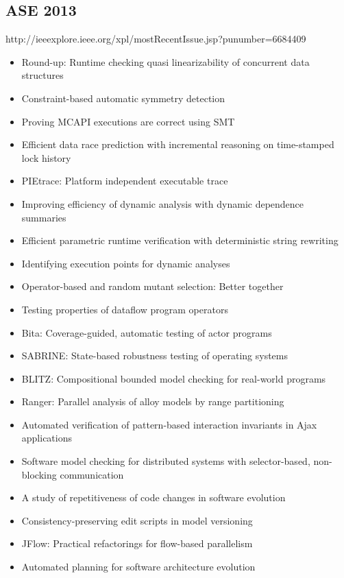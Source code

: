 \subsection{ASE 2013}

http://ieeexplore.ieee.org/xpl/mostRecentIssue.jsp?punumber=6684409

{\small
\begin{itemize}[itemsep=-1ex]
  \item Round-up: Runtime checking quasi linearizability of concurrent data structures
  \item Constraint-based automatic symmetry detection
  \item Proving MCAPI executions are correct using SMT
  \item Efficient data race prediction with incremental reasoning on time-stamped lock history
  \item PIEtrace: Platform independent executable trace
  \item Improving efficiency of dynamic analysis with dynamic dependence summaries
  \item Efficient parametric runtime verification with deterministic string rewriting
  \item Identifying execution points for dynamic analyses
  \item Operator-based and random mutant selection: Better together
  \item Testing properties of dataflow program operators
  \item Bita: Coverage-guided, automatic testing of actor programs
  \item SABRINE: State-based robustness testing of operating systems
  \item BLITZ: Compositional bounded model checking for real-world programs
  \item Ranger: Parallel analysis of alloy models by range partitioning
  \item Automated verification of pattern-based interaction invariants in Ajax applications
  \item Software model checking for distributed systems with selector-based, non-blocking communication
  \item A study of repetitiveness of code changes in software evolution
  \item Consistency-preserving edit scripts in model versioning
  \item JFlow: Practical refactorings for flow-based parallelism
  \item Automated planning for software architecture evolution

\end{itemize}}
